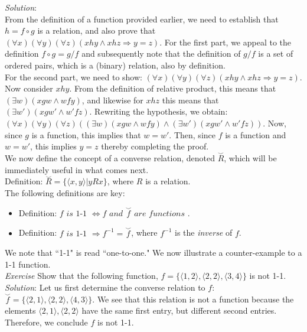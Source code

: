 \textit{Solution}:\\  From the definition of a function provided earlier, we need to establish that $h=f \circ g$ is a relation, and also prove that $(\forall x)(\forall y)(\forall z)(x h y \land x h z \Longrightarrow y = z)$.  For the first part, we appeal to the definition $f \circ g= g/f$ and subsequently note that the definition of $g/f$ is a set of ordered pairs, which is a (binary) relation, also by definition.\\
For the second part, we need to show: $(\forall x)(\forall y)(\forall z)(x h y \land x h z \Longrightarrow y = z)$.  Now consider $x h y$.  From the definition of relative product, this means that $(\exists w)(x g w \land w f y)$, and likewise for $x h z$ this means that  $(\exists w')(x g w' \land w' f z)$. Rewriting the hypothesis, we obtain: $(\forall x)(\forall y)(\forall z)((\exists w)(x g w \land w f y) \land (\exists w')(x g w' \land w' f z))$.  Now, since $g$ is a function, this implies that $w=w'$.  Then, since $f$ is a function and $w=w'$, this implies $y=z$ thereby completing the proof.\\ 

We now define the concept of a converse relation, denoted $\stackrel{\smile}{R}$, which will be immediately useful in what comes next.\\

Definition: $\stackrel{\smile}{R}=\{\langle x,y \rangle | y R x\}$, where $R$ is a relation.\\

The following definitions are key:
\begin{itemize}
\item Definition: $f \textit{ is 1-1 } \Longleftrightarrow f \textit{ and } \stackrel{\smile}{f} \textit{ are functions }$.
\item Definition: $f \textit{ is 1-1 } \Longrightarrow f^{-1}= \stackrel{\smile}{f}$, where $f^{-1}$ is the \textit{inverse} of $f$.
\end{itemize}

We note that ``1-1" is read ``one-to-one."  We now illustrate a counter-example to a 1-1 function.\\

\textit{Exercise}  Show that the following function, $f=\{\langle 1,2 \rangle, \langle 2,2 \rangle, \langle 3,4 \rangle \}$ is not 1-1.\\
\textit{Solution}:  Let us first determine the converse relation to $f$: $\stackrel{\smile}{f}=\{\langle 2,1 \rangle, \langle 2,2 \rangle, \langle 4,3 \rangle \}$.  We see that this relation is not a function because the elements $\langle 2,1 \rangle, \langle 2,2 \rangle$ have the same first entry, but different second entries.  Therefore, we conclude $f$ is not 1-1.\\

